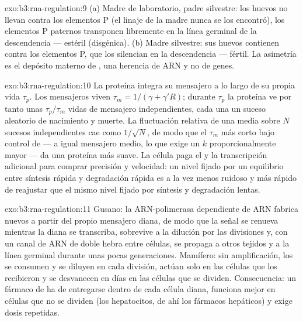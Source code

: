 \begin{solution}{exo:b3:rna-regulation:9}
(a) Madre de laboratorio, padre silvestre: los huevos no llevan 
contra los elementos P (el linaje de la madre nunca se los encontró), los
elementos P paternos transponen libremente en la línea germinal de la
descendencia --- estéril (disgénica). (b) Madre silvestre: sus huevos
contienen  contra los elementos P, que los silencian en la
descendencia --- fértil. La asimetría es el depósito materno de ,
una herencia de ARN y no de genes.
\end{solution}

\begin{solution}{exo:b3:rna-regulation:10}
La proteína integra su mensajero a lo largo de su propia vida
$\tau_{p}$. Los mensajeros viven $\tau_{m} = 1/(\gamma + \gamma' R)$;
durante $\tau_{p}$ la proteína ve por tanto unas $\tau_{p}/\tau_{m}$
vidas de mensajero independientes, cada una un suceso aleatorio de
nacimiento y muerte. La fluctuación relativa de una media sobre $N$
sucesos independientes cae como $1/\sqrt{N}$, de modo que el $\tau_{m}$
más corto bajo control de  --- a igual mensajero medio, lo que
exige un $k$ proporcionalmente mayor --- da una proteína más suave. La
célula paga el  y la transcripción adicional para comprar
precisión y velocidad: un nivel fijado por un equilibrio entre síntesis
rápida y degradación rápida es a la vez menos ruidoso y más rápido de
reajustar que el mismo nivel fijado por síntesis y degradación lentas.
\end{solution}

\begin{solution}{exo:b3:rna-regulation:11}
Gusano: la ARN-polimerasa dependiente de ARN fabrica  nuevos a
partir del propio mensajero diana, de modo que la señal se renueva
mientras la diana se transcriba, sobrevive a la dilución por las
divisiones y, con un canal de ARN de doble hebra entre células, se
propaga a otros tejidos y a la línea germinal durante unas pocas
generaciones. Mamífero: sin amplificación, los  se consumen y se
diluyen en cada división, actúan solo en las células que los recibieron y
se desvanecen en días en las células que se dividen. Consecuencia: un
fármaco de  ha de entregarse dentro de cada célula diana, funciona
mejor en células que no se dividen (los hepatocitos, de ahí los fármacos
hepáticos) y exige dosis repetidas.
\end{solution}

